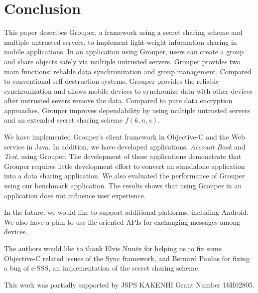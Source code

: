 \documentclass[sigconf]{acmart}
\begin{document}
\section{Conclusion}

This paper describes Grouper, a framework using a secret sharing scheme and multiple untrusted servers, to implement light-weight information sharing in mobile applications.
In an application using Grouper, users can create a group and share objects safely via multiple untrusted servers.
Grouper provides two main functions: reliable data synchronization and group management.
Compared to conventional self-destruction systems, Grouper provides the reliable synchronization and allows mobile devices to synchronize data with other devices after untrusted severs remove the data.
Compared to pure data encryption approaches, Grouper improves dependability by using multiple untrusted servers and an extended secret sharing scheme $f(k, n, s)$.

We have implemented Grouper's client framework in Objective-C and the Web service in Java. 
In addition, we have developed applications, \emph{Account Book} and \emph{Test}, using Grouper.
The development of these applications demonstrate that Grouper requires little development effort to convert an standalone application into a data sharing application.
We also evaluated the performance of Grouper using our benchmark application.
The results shows that using Grouper in an application does not influence user experience.

In the future, we would like to support additional platforms, including Android.
We also have a plan to use file-oriented APIs for exchanging messages among devices.

\begin{acks}
	The authors would like to thank Elvis Nun{\~e}z for helping us to fix some Objective-C related issues of the Sync framework, and Bernard Paulus for fixing a bug of c-SSS, an implementation of the secret sharing scheme.
	
	This work was partially supported by JSPS KAKENHI Grant Number 16H02805.
\end{acks}



 
\end{document}

